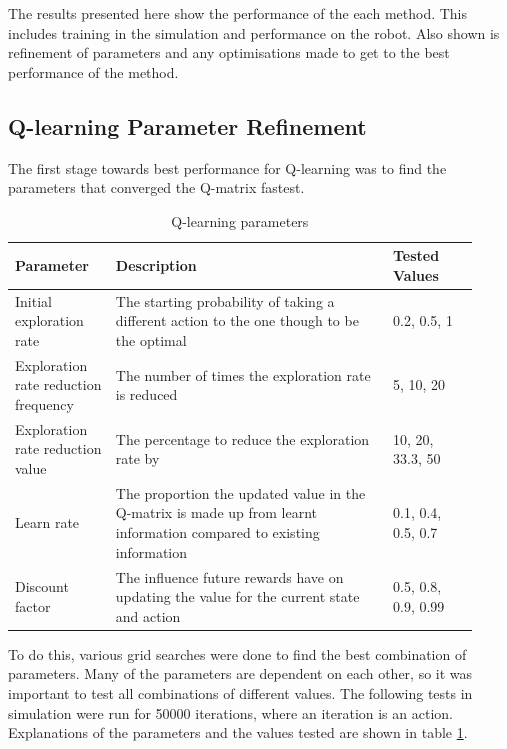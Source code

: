 \documentclass[12pt,a4paper]{article}
\begin{document}
The results presented here show the performance of the each method. This includes training in the simulation and performance on the robot. Also shown is refinement of parameters and any optimisations made to get to the best performance of the method. 

\subsection{Q-learning Parameter Refinement}
The first stage towards best performance for Q-learning was to find the parameters that converged the Q-matrix fastest.
\begin{table}[htb]
\centering
\caption{Q-learning parameters}
\vspace*{6pt}
\label{q_params}
\begin{tabular}{>{\raggedright}p{0.2\linewidth}p{0.55\linewidth}p{0.17\linewidth}}\hline
Parameter & Description& Tested Values\\ \hline\hline
Initial exploration rate & The starting probability of taking a different action to the one though to be the optimal & 0.2, 0.5, 1\\ \hline
Exploration rate reduction frequency & The number of times the exploration rate is reduced & 5, 10, 20\\ \hline
Exploration rate reduction value & The percentage to reduce the exploration rate by & 10, 20, 33.3, 50 \\\hline
Learn rate & The proportion the updated value in the Q-matrix is made up from learnt information compared to existing information & 0.1, 0.4, 0.5,  0.7 \\\hline
Discount factor & The influence future rewards have on updating the value for the current state and action & 0.5, 0.8, 0.9, 0.99 \\\hline
\end{tabular}
\end{table}
To do this, various grid searches were done to find the best combination of parameters. Many of the parameters are dependent on each other, so it was important to test all combinations of different values. The following tests in simulation were run for 50000 iterations, where an iteration is an action. Explanations of the parameters and the values tested are shown in table \ref{q_params}.
\end{document}
